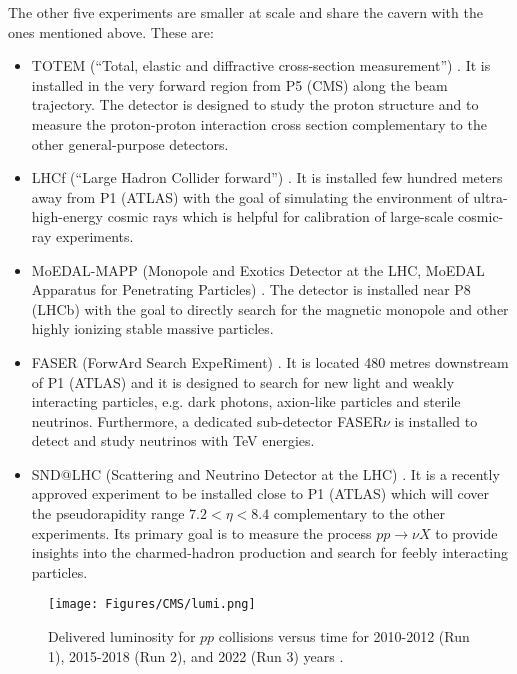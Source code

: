 The other five experiments are smaller at scale and share the cavern with the ones mentioned above. These are:
\begin{itemize}
    \item TOTEM (\enquote{Total, elastic and diffractive cross-section measurement}) \cite{TOTEM:2008lue}. It is installed in the very forward region from P5 (CMS) along the beam trajectory. The detector is designed to study the proton structure and to measure the proton-proton interaction cross section complementary to the other general-purpose detectors.  
    
    \item LHCf (\enquote{Large Hadron Collider forward}) \cite{LHCf:2008lfy}. It is installed few hundred meters away from P1 (ATLAS) with the goal of simulating the environment of ultra-high-energy cosmic rays which is helpful for calibration of large-scale cosmic-ray experiments.
    
    \item MoEDAL-MAPP (Monopole and Exotics Detector at the LHC, MoEDAL Apparatus for Penetrating Particles) \cite{MoEDAL:2009jwa}. The detector is installed near P8 (LHCb) with the goal to directly search for the magnetic monopole and other highly ionizing stable massive particles.
    
    \item FASER (ForwArd Search ExpeRiment) \cite{Feng:2017uoz}. It is located 480 metres downstream of P1 (ATLAS) and it is designed to search for new light and weakly interacting particles, e.g. dark photons, axion-like particles and sterile neutrinos. Furthermore, a dedicated sub-detector FASER$\nu$ is installed to detect and study neutrinos with TeV energies.  
    
    \item SND@LHC (Scattering and Neutrino Detector at the LHC) \cite{SHiP:2020sos}. It is a recently approved experiment to be installed close to P1 (ATLAS) which will cover the pseudorapidity range $7.2 < \eta < 8.4$ complementary to the other experiments. Its primary goal is to measure the process $pp\to\nu X$ to provide insights into the charmed-hadron production and search for feebly interacting particles.
\end{itemize}

\begin{figure}[h!]
    \centering
    \texttt{[image: Figures/CMS/lumi.png]}
    \caption{Delivered luminosity for $pp$ collisions versus time for 2010-2012 (Run 1), 2015-2018 (Run 2), and 2022 (Run 3) years \cite{CMS:lumi}.}
    \label{fig:lumi}
\end{figure}

